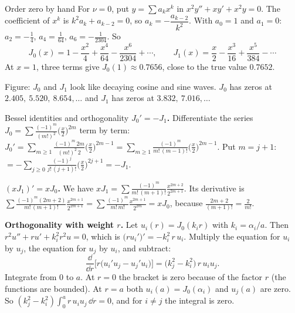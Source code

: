 \begin{examplebox}{Order zero by hand}
For $\nu=0$, put $y=\sum a_kx^k$ in $x^2y''+xy'+x^2y=0$. The coefficient of $x^k$ is $k^2a_k + a_{k-2}=0$, so $a_k = -\dfrac{a_{k-2}}{k^2}$. With $a_0=1$ and $a_1=0$: $a_2 = -\frac14$, $a_4 = \frac1{64}$, $a_6 = -\frac1{2304}$. So
\[ J_0(x) = 1 - \frac{x^2}{4} + \frac{x^4}{64} - \frac{x^6}{2304} + \cdots, \qquad J_1(x) = \frac x2 - \frac{x^3}{16} + \frac{x^5}{384} - \cdots \]
At $x=1$, three terms give $J_0(1)\approx 0.7656$, close to the true value $0.7652$.
\end{examplebox}

\begin{center}

{\small Figure: $J_0$ and $J_1$ look like decaying cosine and sine waves. $J_0$ has zeros at $2.405,\ 5.520,\ 8.654,\dots$ and $J_1$ has zeros at $3.832,\ 7.016,\dots$}
\end{center}

\begin{derivbox}{Bessel identities and orthogonality}
\textbf{$J_0' = -J_1$.} Differentiate the series $J_0 = \sum\frac{(-1)^m}{(m!)^2}\big(\frac x2\big)^{2m}$ term by term: $J_0' = \sum_{m\ge1}\frac{(-1)^m\,2m}{(m!)^2\,2}\big(\frac x2\big)^{2m-1} = \sum_{m\ge1}\frac{(-1)^m}{m!\,(m-1)!}\big(\frac x2\big)^{2m-1}$. Put $m = j+1$: $= -\sum_{j\ge0}\frac{(-1)^j}{j!\,(j+1)!}\big(\frac x2\big)^{2j+1} = -J_1$.

\textbf{$(xJ_1)' = xJ_0$.} We have $xJ_1 = \sum\frac{(-1)^m}{m!\,(m+1)!}\frac{x^{2m+2}}{2^{2m+1}}$. Its derivative is $\sum\frac{(-1)^m(2m+2)}{m!\,(m+1)!}\frac{x^{2m+1}}{2^{2m+1}} = \sum\frac{(-1)^m}{m!\,m!}\frac{x^{2m+1}}{2^{2m}} = xJ_0$, because $\frac{2m+2}{(m+1)!} = \frac{2}{m!}$.

\textbf{Orthogonality with weight $r$.} Let $u_i(r) = J_0(k_ir)$ with $k_i = \alpha_i/a$. Then $r^2u'' + ru' + k_i^2r^2u = 0$, which is $\big(ru_i'\big)' = -k_i^2\,r\,u_i$. Multiply the equation for $u_i$ by $u_j$, the equation for $u_j$ by $u_i$, and subtract:
\[ \frac{\dd}{\dd r}\Big[r\big(u_i'u_j - u_j'u_i\big)\Big] = \big(k_j^2 - k_i^2\big)\,r\,u_iu_j . \]
Integrate from $0$ to $a$. At $r=0$ the bracket is zero because of the factor $r$ (the functions are bounded). At $r=a$ both $u_i(a) = J_0(\alpha_i)$ and $u_j(a)$ are zero. So $(k_j^2 - k_i^2)\int_0^ar\,u_iu_j\,\dd r = 0$, and for $i\neq j$ the integral is zero.
\end{derivbox}

